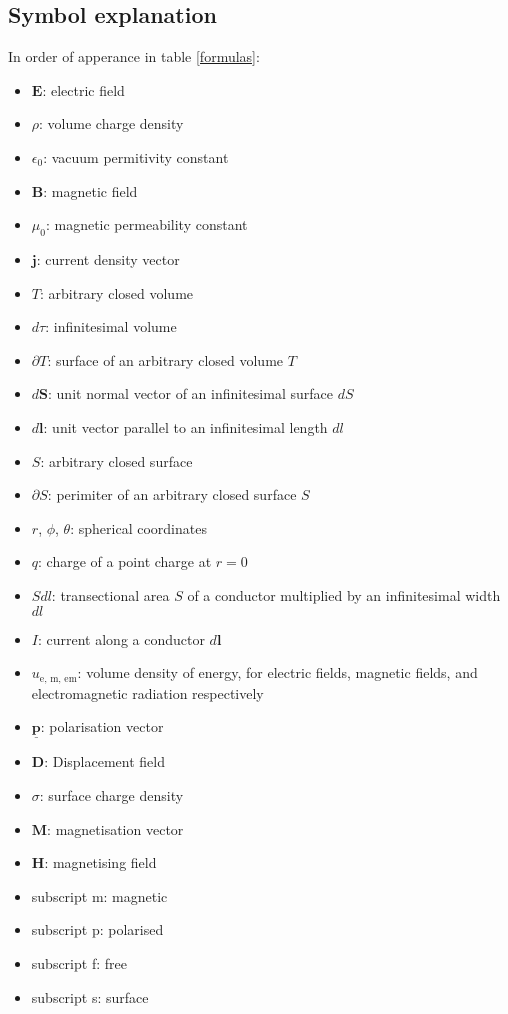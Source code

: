 \documentclass[a4paper, 12pt]{article}
\renewcommand{\vec}[1]{\bm{#1}}
\newcommand{\E}{\ensuremath{\vec{E}}}
\newcommand{\e}{\ensuremath{\epsilon_0}}
\newcommand{\p}{\ensuremath{\vec{\underline{p}}}}
\newcommand{\D}{\ensuremath{\vec{D}}}
\renewcommand{\j}{\ensuremath{\vec{j}}}
\newcommand{\B}{\ensuremath{\vec{B}}}
\renewcommand{\H}{\ensuremath{\vec{H}}}
\begin{document}
    \subsection{Symbol explanation}
    In order of apperance in table \ref{formulas}:  
    \begin{itemize}
        \setlength\itemsep{.1em}
        \item \E: electric field 
        \item $\rho$: volume charge density
        \item \e: vacuum permitivity constant
        \item \B: magnetic field
        \item $\mu_0$: magnetic permeability constant
        \item \j: current density vector
        \item $T$: arbitrary closed volume
        \item $d\tau$: infinitesimal volume
        \item $\partial T$: surface of an arbitrary closed volume $T$
        \item $d\vec{S}$: unit normal vector of an infinitesimal surface $dS$
        \item $d\vec{l}$: unit vector parallel to an infinitesimal length $dl$
        \item $S$: arbitrary closed surface
        \item $\partial S$: perimiter of an arbitrary closed surface $S$
        \item $r$, $\phi$, $\theta$: spherical coordinates
        \item $q$: charge of a point charge at $r=0$
        \item $Sdl$: transectional area $S$ of a conductor multiplied by an infinitesimal width $dl$
        \item $I$: current along a conductor $d\vec{l}$
        \item $u_\text{e, m, em}$: volume density of energy, for electric fields, magnetic fields, and electromagnetic radiation respectively
        \item \p: polarisation vector
        \item \D: Displacement field
        \item $\sigma$: surface charge density
        \item $\vec{M}$: magnetisation vector
        \item \H: magnetising field
        \item subscript m: magnetic
        \item subscript p: polarised
        \item subscript f: free 
        \item subscript s: surface
    \end{itemize}
\end{document}
